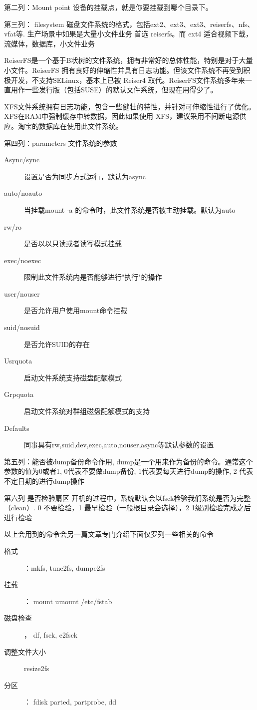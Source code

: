 第二列：Mount point 设备的挂载点，就是你要挂载到哪个目录下。

第三列： filesystem 磁盘文件系统的格式，包括ext2、ext3、ext3、reiserfs、nfs、vfat等. 生产场景中如果是大量小文件业务 首选 reiserfs。而 ext4 适合视频下载，流媒体，数据库，小文件业务

 ReiserFS是一个基于B状树的文件系统，拥有非常好的总体性能，特别是对于大量小文件。ReiserFS 拥有良好的伸缩性并具有日志功能。但该文件系统不再受到积极开发，不支持SELinux，基本上已被 Reiser4 取代。ReiserFS文件系统多年来一直用作一些发行版（包括SUSE）的默认文件系统，但现在用得少了。

 XFS文件系统拥有日志功能，包含一些健壮的特性，并针对可伸缩性进行了优化。XFS在RAM中强制缓存中转数据，因此如果使用 XFS，建议采用不间断电源供应。淘宝的数据库在使用此文件系统。

第四列：parameters 文件系统的参数

\begin{description}
	\item[Async/sync]设置是否为同步方式运行，默认为async
	\item[auto/noauto]当挂载mount -a 的命令时，此文件系统是否被主动挂载。默认为auto
	\item[rw/ro      ]是否以以只读或者读写模式挂载
	\item[exec/noexec]限制此文件系统内是否能够进行"执行"的操作
	\item[user/nouser]是否允许用户使用mount命令挂载
	\item[suid/nosuid]是否允许SUID的存在
	\item[Usrquota	]启动文件系统支持磁盘配额模式
	\item[Grpquota	]启动文件系统对群组磁盘配额模式的支持
	\item[Defaults	]同事具有rw,suid,dev,exec,auto,nouser,async等默认参数的设置
\end{description}

第五列：能否被dump备份命令作用, dump是一个用来作为备份的命令。通常这个参数的值为0或者1, 0代表不要做dump备份, 1代表要每天进行dump的操作, 2 代表不定日期的进行dump操作

第六列 是否检验扇区 开机的过程中，系统默认会以fsck检验我们系统是否为完整（clean）. 0 不要检验，1 最早检验（一般根目录会选择），2 1级别检验完成之后进行检验


 以上会用到的命令会另一篇文章专门介绍下面仅罗列一些相关的命令
\begin{description}
	\item[格式]：mkfs, tune2fs, dumpe2fs
	\item[挂载]： mount umount /etc/fstab
	\item[磁盘检查]， df, fsck,  e2fsck
	\item[调整文件大小] resize2fs
	\item[分区]： fdisk parted, partprobe, dd
\end{description}


